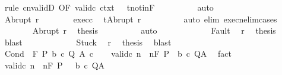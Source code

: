\begin{isabellebody}
\ {\isacharparenleft}rule\ cnvalidD\ {\isacharbrackleft}OF\ valid{\isacharunderscore}c{}\ ctxt\ {\isacharunderscore}\ {\isacharunderscore}\ t{\isacharunderscore}notin{\isacharunderscore}F{\isacharbrackright}{\isacharparenright}\isanewline
\ \ \ \ \ \ \ \ \isamarkupfalse%
\ auto\isanewline
\ \ \ \ \ \ \ \ \isamarkupfalse%
\isanewline
\ \ \ \ \isamarkupfalse%
\isanewline
\ \ \ \ \ \ \isamarkupfalse%
\ {\isacharparenleft}Abrupt\ r{\isacharprime}{\isacharparenright}\isanewline
\ \ \ \ \ \ \isamarkupfalse%
\ exec{\isacharunderscore}c{}\ \isamarkupfalse%
\ {\isachardoublequoteopen}t{\isacharequal}Abrupt\ r{\isacharprime}{\isachardoublequoteclose}\isanewline
\ \ \ \ \ \ \ \ \isamarkupfalse%
\ {\isacharparenleft}auto\ elim{\isacharcolon}\ execn{\isacharunderscore}elim{\isacharunderscore}cases{\isacharparenright}\isanewline
\ \ \ \ \ \ \isamarkupfalse%
\ Abrupt\ r\ \isamarkupfalse%
\ {\isacharquery}thesis\isanewline
\ \ \ \ \ \ \ \ \isamarkupfalse%
\ auto\isanewline
\ \ \ \ \isamarkupfalse%
\isanewline
\ \ \ \ \ \ \isamarkupfalse%
\ Fault\ \isamarkupfalse%
\ r\ \isamarkupfalse%
\ {\isacharquery}thesis\ \isamarkupfalse%
\ blast\isanewline
\ \ \ \ \isamarkupfalse%
\isanewline
\ \ \ \ \ \ \isamarkupfalse%
\ Stuck\ \isamarkupfalse%
\ r\ \isamarkupfalse%
\ {\isacharquery}thesis\ \isamarkupfalse%
\ blast\isanewline
\ \ \ \ \isamarkupfalse%
\isanewline
\ \ \isamarkupfalse%
\isanewline
{}\isamarkupfalse%
\isanewline
\ \ \isamarkupfalse%
\ {\isacharparenleft}Cond\ {\isasymTheta}\ F\ P\ b\ c{}\ Q\ A\ c{}{\isacharparenright}\isanewline
\ \ \isamarkupfalse%
\ valid{\isacharunderscore}c{}{\isacharcolon}\ {\isachardoublequoteopen}{\isasymAnd}n{\isachardot}\ {\isasymGamma}{\isacharcomma}{\isasymTheta}\ {\isasymTurnstile}n{\isacharcolon}\isactrlbsub {\isacharslash}F\isactrlesub \ {\isacharparenleft}P\ {\isasyminter}\ b{\isacharparenright}\ c{}\ Q{\isacharcomma}A{\isachardoublequoteclose}\ \isamarkupfalse%
\ fact\isanewline
\ \ \isamarkupfalse%
\ valid{\isacharunderscore}c{}{\isacharcolon}\ {\isachardoublequoteopen}{\isasymAnd}n{\isachardot}\ {\isasymGamma}{\isacharcomma}{\isasymTheta}\ {\isasymTurnstile}n{\isacharcolon}\isactrlbsub {\isacharslash}F\isactrlesub \ {\isacharparenleft}P\ {\isasyminter}\ {\isacharminus}\ b{\isacharparenright}\ c{}\ Q{\isacharcomma}A{\isachardoublequoteclose}\ \isamarkupfalse%

\end{isabellebody}
